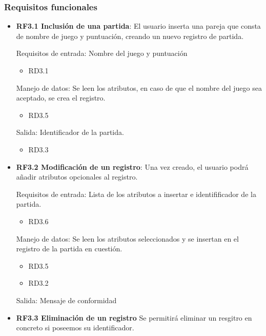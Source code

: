 \subsubsection{Requisitos funcionales}

\begin{itemize}

	\item \textbf{RF3.1 Inclusión de una partida}: El usuario inserta una pareja que consta de nombre de juego y puntuación, creando un nuevo registro de partida.

	Requisitos de entrada: Nombre del juego y puntuación
	\begin{itemize}
		\item RD3.1
	\end{itemize}

	Manejo de datos: Se leen los atributos, en caso de que el nombre del juego sea aceptado, se crea el registro.
	\begin{itemize}
		\item RD3.5
	\end{itemize}

	Salida: Identificador de la partida.
	\begin{itemize}
		\item RD3.3
	\end{itemize}

	\item \textbf{RF3.2 Modificación de un registro}: Una vez creado, el usuario podrá añadir atributos opcionales al registro.

	Requisitos de entrada: Lista de los atributos a insertar e identifificador de la partida.\\
	\begin{itemize}
		\item RD3.6
	\end{itemize}

	Manejo de datos: Se leen los atributos seleccionados y se insertan en el registro de la partida en cuestión. \\
	\begin{itemize}
		\item RD3.5
		\item RD3.2
	\end{itemize}

	Salida: Mensaje de conformidad

	\item \textbf{RF3.3 Eliminación de un registro} Se permitirá eliminar un resgitro en concreto si poseemos su identificador.


\end{itemize}
